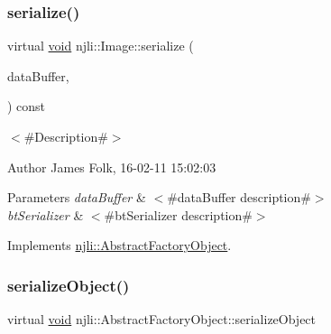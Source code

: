 \mbox{\label{classnjli_1_1_image_afcb866b82c4c82524678b261bd1963ed}} 
\subsubsection{\texorpdfstring{serialize()}{serialize()}}
{\footnotesize\ttfamily virtual \mbox{\hyperlink{_thread_8h_af1e856da2e658414cb2456cb6f7ebc66}{void}} njli\+::\+Image\+::serialize (\begin{DoxyParamCaption}\item[{\mbox{\hyperlink{_thread_8h_af1e856da2e658414cb2456cb6f7ebc66}{void}} $\ast$}]{data\+Buffer,  }\item[{bt\+Serializer $\ast$}]{ }\end{DoxyParamCaption}) const\hspace{0.3cm}{\ttfamily [virtual]}}



$<$\#\+Description\#$>$ 

\begin{DoxyAuthor}{Author}
James Folk, 16-\/02-\/11 15\+:02\+:03
\end{DoxyAuthor}

\begin{DoxyParams}{Parameters}
{\em data\+Buffer} & $<$\#data\+Buffer description\#$>$ \\
\hline
{\em bt\+Serializer} & $<$\#bt\+Serializer description\#$>$ \\
\hline
\end{DoxyParams}


Implements \mbox{\hyperlink{classnjli_1_1_abstract_factory_object_aad2fbe86fb3bdecf02918a96b9c57976}{njli\+::\+Abstract\+Factory\+Object}}.

\mbox{\label{classnjli_1_1_image_a4fc4bcd9d1930911474210c047372fc0}} 
\subsubsection{\texorpdfstring{serialize\+Object()}{serializeObject()}}
{\footnotesize\ttfamily virtual \mbox{\hyperlink{_thread_8h_af1e856da2e658414cb2456cb6f7ebc66}{void}} njli\+::\+Abstract\+Factory\+Object\+::serialize\+Object}

